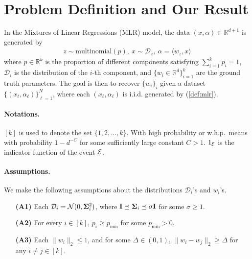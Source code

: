 \section{Problem Definition and Our Result} \label{sec:preli}

In the Mixtures of Linear Regressions (MLR) model, the data $(x, \alpha) \in \mathbb{R}^{d+1}$ is generated by
\begin{align} \label{def:mlr}
  z \sim \mbox{multinomial}(p), ~x \sim \mathcal{D}_z,~ \alpha = \langle w_z, x \rangle
\end{align}
where $p \in \mathbb{R}^k$ is the proportion of different components satisfying $\sum_{i=1}^k p_i=1$, $\mathcal{D}_i$ is the distribution of the $i$-th component, and $\{w_i \in \mathbb{R}^d\}_{i=1}^k $ are the ground truth parameters. The goal is then to recover $\{w_i\}_i$ given a dataset $\{(x_\ell, \alpha_\ell)\}_{\ell=1}^{N}$, where each $(x_\ell, \alpha_\ell)$ is i.i.d. generated by (\ref{def:mlr}).


\paragraph{Notations.} $[k]$ is used to denote the set $\{1, 2, \ldots, k\}$. With high probability or w.h.p.\ means with probability $1 - d^{-C}$ for some sufficiently large constant $C>1$. $1_{\mathcal{E}}$ is the indicator function of the event $\mathcal{E}$.


\paragraph{Assumptions.} We make the following assumptions about the distributions $\mathcal{D}_i$'s and $w_i$'s.
\begin{enumerate}
\item[\textbf{(A1)}] Each $\mathcal{D}_i = \mathcal{N}(0, \bold{\Sigma}_i^2)$, where $\bold{I} \preceq  \bold{\Sigma}_i \preceq \sigma \bold{I}$ for some $\sigma \ge 1$.

\item[\textbf{(A2)}] For every $i \in [k]$, $p_i \ge p_{\min}$ for some $p_{\min} > 0$.

\item[\textbf{(A3)}] Each $\| w_i\|_2 \leq1$, and for some $\Delta \in (0,1)$, 
$
  \| w_i - w_j \|_2 \geq \Delta
$
for any $i \neq j \in [k]$.
\end{enumerate}

